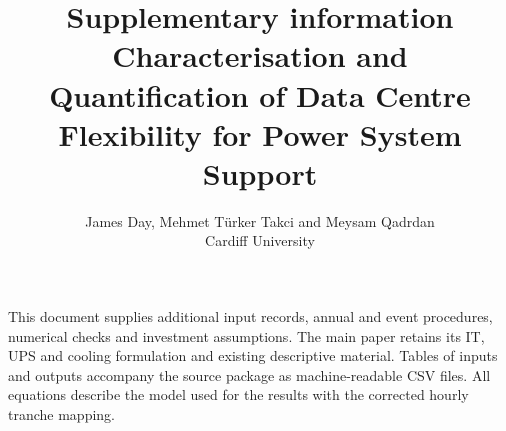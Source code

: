 \documentclass[11pt,a4paper]{article}
\title{Supplementary information\\\large Characterisation and Quantification of Data Centre Flexibility for Power System Support}
\author{James Day, Mehmet T\"urker Takci and Meysam Qadrdan\\Cardiff University}
\date{}
\begin{document}
\raggedbottom
\maketitle
\noindent This document supplies additional input records, annual and event procedures, numerical checks and investment assumptions. The main paper retains its IT, UPS and cooling formulation and existing descriptive material. Tables of inputs and outputs accompany the source package as machine-readable CSV files. All equations describe the model used for the results with the corrected hourly tranche mapping.





\end{document}
